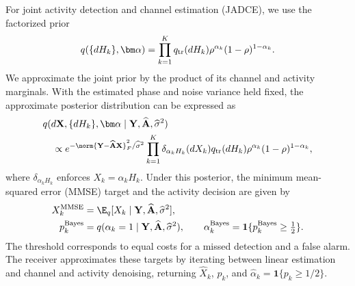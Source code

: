 For joint activity detection and channel estimation (JADCE), we use
the factorized prior
\begin{equation}
 q(\{dH_k\},\bm\alpha)=
 \prod_{k=1}^{K}q_{\rm tr}(dH_k)
 \rho^{\alpha_k}(1-\rho)^{1-\alpha_k}.
 \label{eq:working-prior}
\end{equation}
We approximate the joint prior by the product of its channel
and activity marginals. With the estimated phase and noise variance
held fixed, the approximate posterior distribution can be expressed as
\begin{equation}
 \begin{aligned}
 &q(d\mathbf X,\{dH_k\},\bm\alpha\mid
 \mathbf Y,\widehat{\mathbf A},\widehat\sigma^2)\\
 &\quad\propto
 e^{-\norm{\mathbf Y-\widehat{\mathbf A}\mathbf X}_F^2/\widehat\sigma^2}
 \prod_{k=1}^{K}
 \delta_{\alpha_kH_k}(dX_k)q_{\rm tr}(dH_k)
 \rho^{\alpha_k}(1-\rho)^{1-\alpha_k},
 \end{aligned}
 \label{eq:working-posterior}
\end{equation}
where $\delta_{\alpha_kH_k}$ enforces $X_k=\alpha_kH_k$.
Under this posterior, the minimum mean-squared error (MMSE) target
and the activity decision are given by
\begin{equation}
 \begin{aligned}
 X_k^{\rm MMSE}&=\E_q[X_k\mid\mathbf Y,\widehat{\mathbf A},\widehat\sigma^2],\\
 p_k^{\rm Bayes}&=q(\alpha_k=1\mid\mathbf Y,\widehat{\mathbf A},\widehat\sigma^2),\qquad
 \alpha_k^{\rm Bayes}=\mathbf1\{p_k^{\rm Bayes}\geq\tfrac12\}.
 \end{aligned}
 \label{eq:targets}
\end{equation}
The threshold corresponds to equal costs for a missed detection and a
false alarm. The receiver approximates these targets by iterating between
linear estimation and channel and activity denoising, returning
$\widehat X_k$, $p_k$, and $\widehat\alpha_k=\mathbf1\{p_k\geq1/2\}$.
